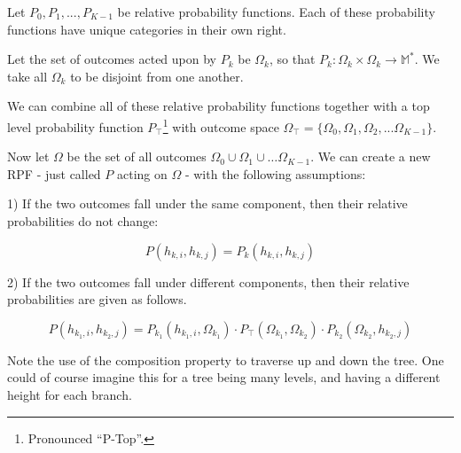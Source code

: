 \documentclass[twoside]{article}
\newcommand{\quotes}[1]{``#1''}
\theoremstyle{plain}%
\theoremstyle{definition}
\theoremstyle{remark}
\begin{document}
Let \(P_0, P_1, ..., P_{K-1}\) be relative probability functions. Each of these probability functions have unique categories in their own right.

Let the set of outcomes acted upon by \(P_k\) be \(\Omega_k\), so that \(P_k: \Omega_k \times \Omega_k \rightarrow \mathbb{M}^{\ast}\). We take all \(\Omega_k\) to be disjoint from one another.

We can combine all of these relative probability functions together with a top level probability function \(P_\top\)\footnote{Pronounced \quotes{P-Top}.} with outcome space \(\Omega_\top = \{\Omega_0, \Omega_1, \Omega_2, ... \Omega_{K- 1}\}\).


Now let \(\Omega\) be the set of all outcomes \(\Omega_0 \cup \Omega_1 \cup \dots \Omega_{K-1}\). We can create a new RPF - just called \(P\) acting on \(\Omega\) - with the following assumptions:

1) If the two outcomes fall under the same component, then their relative probabilities do not change:

\begin{equation}
\label{rpf_composition_same_branch}
P(h_{k, i}, h_{k, j}) = P_k(h_{k, i}, h_{k, j})
\end{equation}

2) If the two outcomes fall under different components, then their relative probabilities are given as follows.

\begin{equation}
\label{eq:rpf_composition_different_branch}
P(h_{k_1, i}, h_{k_2, j}) = P_{k_1}(h_{k_1, i}, \Omega_{k_1}) \cdot  P_{\top}(\Omega_{k_1}, \Omega_{k_2}) \cdot P_{k_2}(\Omega_{k_2}, h_{k_2, j})
\end{equation}

Note the use of the composition property to traverse up and down the tree. One could of course imagine this for a tree being many levels, and having a different height for each branch.
\end{document}
